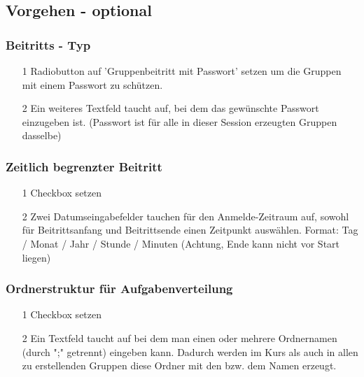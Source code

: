 \subsection*{Vorgehen - optional}

\subsubsection*{Beitritts - Typ}
\begin{itemize}
	\item[1] Radiobutton auf  'Gruppenbeitritt mit Passwort'   setzen um die Gruppen mit einem Passwort zu schützen. 
	\item[2] Ein weiteres Textfeld taucht auf, bei dem das gewünschte Passwort einzugeben ist. (Passwort ist für alle in dieser Session erzeugten Gruppen dasselbe)
\end{itemize}

\subsubsection*{Zeitlich begrenzter Beitritt}
\begin{itemize}
	\item[1] Checkbox setzen 
	\item[2] Zwei Datumseingabefelder tauchen für den Anmelde-Zeitraum auf, sowohl für Beitrittsanfang und Beitrittsende einen Zeitpunkt auswählen. Format: Tag / Monat / Jahr / Stunde / Minuten 
	(Achtung, Ende kann nicht vor Start liegen)
	
\end{itemize}

\subsubsection*{Ordnerstruktur für Aufgabenverteilung}
\begin{itemize}
	\item[1] Checkbox setzen 
	\item[2] Ein Textfeld taucht auf bei dem man einen oder mehrere Ordnernamen (durch ";" getrennt) eingeben kann. Dadurch werden im Kurs als auch in allen zu erstellenden Gruppen diese Ordner mit den bzw. dem Namen erzeugt.
	
\end{itemize}
\clearpage


